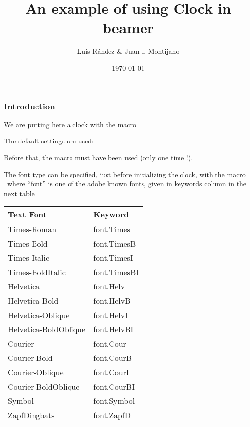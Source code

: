 \documentclass[12pt]{beamer}
\title[A clock in beamer]{An example of using Clock in beamer}
\author{Luis R\'{a}ndez \& Juan I. Montijano}
\institute[IUMA]{IUMA \\ Universidad de Zaragoza }
\date{\today}
\begin{document}
\frame{\titlepage}


\begin{frame}[t]

\frametitle{Introduction}


\initclock  %

We are putting here a clock with the macro  \quad
{}

\medskip

The default settings are used:  \insertclock

\medskip

Before that, the macro \quad  {}
\quad must have been used (only one time !).

\end{frame}

\begin{frame}
The font type can be specified, just before initializing the clock, with the macro
\    \
where ``font'' is one of the adobe known fonts, given in keywords column in the next table

\begin{center}
{\footnotesize
\begin{tabular}{ll}
Text Font & Keyword  \\
\hline
Times-Roman  & font.Times \\
Times-Bold  & font.TimesB \\
Times-Italic  & font.TimesI \\
Times-BoldItalic  & font.TimesBI \\
Helvetica & font.Helv \\
Helvetica-Bold & font.HelvB \\
Helvetica-Oblique & font.HelvI \\
Helvetica-BoldOblique & font.HelvBI \\
Courier & font.Cour \\
Courier-Bold & font.CourB \\
Courier-Oblique & font.CourI \\
Courier-BoldOblique & font.CourBI \\
Symbol & font.Symbol \\
ZapfDingbats & font.ZapfD  \\
\end{tabular}
}
\end{center}

\end{frame}
\end{document}
